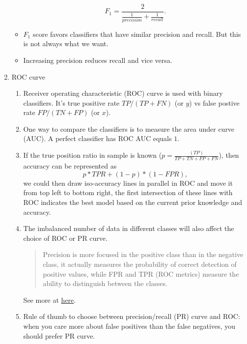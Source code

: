 \documentclass[12pt,oneside,a4paper]{article}
\numberwithin{equation}{section}
\begin{document}
\begin{enumerate}
\begin{itemize}
\begin{equation*}
F_1 = \frac{2}{\frac{1}{precision} + \frac{1}{recall}}.
\end{equation*}

\item $F_1$ score favors classifiers that have similar precision and recall. But this is not always what we want. 

\item Increasing precision reduces recall and vice versa. 
\end{itemize}

\item ROC curve 

\begin{enumerate}
\item Receiver operating characteristic (ROC) curve is used with binary classifiers. It's true positive rate $TP/(TP + FN)$ (or $y$) vs false postive rate $FP/(TN + FP)$ (or $x$).
\item One way to compare the classifiers is to measure the area under curve (AUC). A perfect classifier has ROC AUC equals $1$.

\item If the true position ratio in sample is known ($p = \frac{(TP)}{TP + TN + FP + FN}$), then accuracy can be represented as 
\begin{equation}
p * TPR + (1-p) * (1 - FPR),
\end{equation}
we could then draw iso-accuracy lines in parallel in ROC and move it from top left to bottom right, the first intersection of these lines with ROC indicates the best model based on the current prior knowledge and accuracy. 
\item The imbalanced number of data in different classes will also affect the choice of ROC or PR curve. 
\begin{quote}
Precision is more focused in the positive class than in the negative class, it actually measures the probability of correct detection of positive values, while FPR and TPR (ROC metrics) measure the ability to distinguish between the classes.
\end{quote} 
See more at \href{https://towardsdatascience.com/what-metrics-should-we-use-on-imbalanced-data-set-precision-recall-roc-e2e79252aeba}{here}.
\item Rule of thumb to choose between precision/recall (PR) curve and ROC: when you care more about false positives than the false negatives, you should prefer PR curve. 
\end{enumerate}
\end{enumerate}
\end{document}
